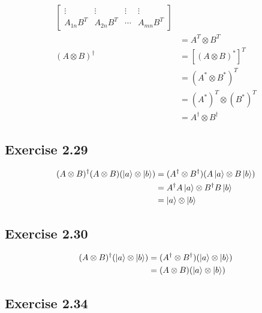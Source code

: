 \documentclass{article}
\begin{document}
\begin{align*}
\begin{bmatrix}
                              \vdots     & \vdots     & \vdots & \vdots     \\
                              A_{1n} B^T & A_{2n} B^T & \cdots & A_{mn} B^T
                            \end{bmatrix}       \\
                        & = A^T \otimes B^T                                     \\
  (A \otimes B)^\dagger & = [(A \otimes B)^*]^T                                 \\
                        & = (A^* \otimes B^*)^T                                 \\
                        & = (A^*)^T \otimes (B^*)^T                             \\
                        & = A^\dagger \otimes B^\dagger
\end{align*}

\subsection*{Exercise 2.29}

\begin{align*}
  (A \otimes B)^\dagger (A \otimes B) (\ket{a} \otimes \ket{b}) & = (A^\dagger \otimes B^\dagger) (A \ket{a} \otimes B \ket{b}) \\
                                                                & = A^\dagger A \ket{a} \otimes B^\dagger B \ket{b}             \\
                                                                & = \ket{a} \otimes \ket{b}
\end{align*}

\subsection*{Exercise 2.30}

\begin{align*}
  (A \otimes B)^\dagger (\ket{a} \otimes \ket{b}) & = (A^\dagger \otimes B^\dagger) (\ket{a} \otimes \ket{b}) \\
                                                  & = (A \otimes B) (\ket{a} \otimes \ket{b})
\end{align*}

\subsection*{Exercise 2.34}
\end{document}
